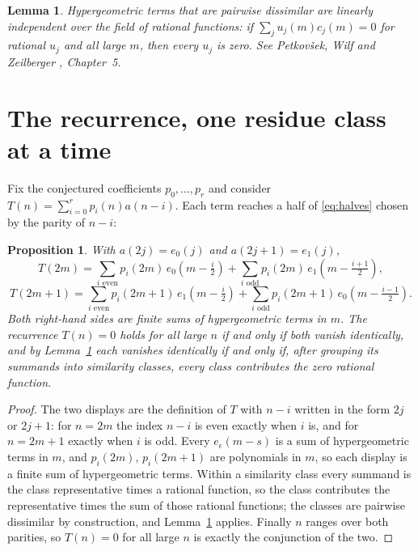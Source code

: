 \documentclass[11pt,a4paper]{article}
\theoremstyle{plain}
\newtheorem{lemma}[theorem]{Lemma}
\newtheorem{proposition}[theorem]{Proposition}
\theoremstyle{definition}
\begin{document}
\begin{lemma}\label{lem:indep}
Hypergeometric terms that are pairwise dissimilar are linearly independent over the field
of rational functions: if $\sum_{j}u_{j}(m)c_{j}(m)=0$ for rational $u_{j}$ and all large
$m$, then every $u_{j}$ is zero. See Petkov\v{s}ek, Wilf and Zeilberger \cite{AB},
Chapter~5.
\end{lemma}

\section{The recurrence, one residue class at a time}

Fix the conjectured coefficients $p_{0},\dots,p_{r}$ and consider
$T(n)=\sum_{i=0}^{r}p_{i}(n)a(n-i)$. Each term reaches a half of \eqref{eq:halves} chosen
by the parity of $n-i$:

\begin{proposition}\label{prop:split}
With $a(2j)=e_{0}(j)$ and $a(2j+1)=e_{1}(j)$,
\[
T(2m)=\sum_{i \text{ even}}p_{i}(2m)\,e_{0}\!\left(m-\tfrac{i}{2}\right)
      +\sum_{i \text{ odd}}p_{i}(2m)\,e_{1}\!\left(m-\tfrac{i+1}{2}\right),
\]
\[
T(2m+1)=\sum_{i \text{ even}}p_{i}(2m+1)\,e_{1}\!\left(m-\tfrac{i}{2}\right)
      +\sum_{i \text{ odd}}p_{i}(2m+1)\,e_{0}\!\left(m-\tfrac{i-1}{2}\right).
\]
Both right-hand sides are finite sums of hypergeometric terms in $m$. The recurrence
$T(n)=0$ holds for all large $n$ if and only if both vanish identically, and by
Lemma~\ref{lem:indep} each vanishes identically if and only if, after grouping its
summands into similarity classes, every class contributes the zero rational function.
\end{proposition}

\begin{proof}
The two displays are the definition of $T$ with $n-i$ written in the form $2j$ or $2j+1$:
for $n=2m$ the index $n-i$ is even exactly when $i$ is, and for $n=2m+1$ exactly when $i$
is odd. Every $e_{\epsilon}(m-s)$ is a sum of hypergeometric terms in $m$, and
$p_{i}(2m)$, $p_{i}(2m+1)$ are polynomials in $m$, so each display is a finite sum of
hypergeometric terms. Within a similarity class every summand is the class representative
times a rational function, so the class contributes the representative times the sum of
those rational functions; the classes are pairwise dissimilar by construction, and
Lemma~\ref{lem:indep} applies. Finally $n$ ranges over both parities, so $T(n)=0$ for all
large $n$ is exactly the conjunction of the two.
\end{proof}
\end{document}
